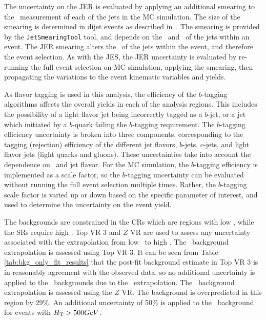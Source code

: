 The uncertainty on the JER is evaluated by applying an additional smearing to
the \pt\ measurement of each of the jets in the MC simulation.
The size of the smearing is determined in dijet events as described
in~\cite{JER}.
The smearing is provided by the \texttt{JetSmearingTool} tool, and depends on
the \pt\ and \eta\ of the jets within an event.
The JER smearing alters the \pt\ of the jets within the event, and therefore
the event selection.
As with the JES, the JER uncertainty is evaluated by re-running the full event
selection on MC simulation, applying the smearing, then propagating the
variations to the event kinematic variables and yields.

As flavor tagging is used in this analysis, the efficiency of the $b$-tagging
algorithms affects the overall yields in each of the analysis regions.
This includes the possibility of a light flavor jet being incorrectly tagged
as a $b$-jet, or a jet which initiated by a $b$-quark failing the $b$-tagging
requirement.
The $b$-tagging efficiency uncertainty is broken into three components,
corresponding to the tagging (rejection) efficiency of the different jet
flavors, $b$-jets, $c$-jets, and light flavor jets (light quarks and gluons).
These uncertainties take into account the dependence on \pt\ and jet flavor.
For the MC simulation, the $b$-tagging efficiency is implemented as a scale
factor, so the $b$-tagging uncertainty can be evaluated without running the
full event selection multiple times.
Rather, the $b$-tagging scale factor is varied up or down based on the specific
parameter of interest, and used to determine the uncertainty on the event yield.

The backgrounds are constrained in the CRs which are regions with low \HT,
while the SRs require high \HT.
Top VR 3 and $Z$ VR are used to assess any uncertainty associated with the
extrapolation from low \HT\ to high \HT.
The \TTBAR\ background extrapolation is assessed using Top VR 3. It can be seen
from Table \ref{tab:bkg_only_fit_results} that the post-fit background estimate
in Top VR 3 is in reasonably agreement with the observed data, so no additional
uncertainty is applied to the \TTBAR\ backgrounds due to the \HT\ extrapolation.
The \ZGAMMAJETS\ background extrapolation is assessed using the $Z$ VR.
The background is overpredicted in this region by 29\%.
An additional uncertainty of 50\% is applied to the \ZGAMMAJETS\ background
for events with $H_{\mathrm{T}} > 500 GeV$.

